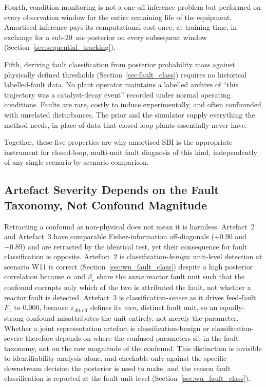 \documentclass[aps,pre,twocolumn,superscriptaddress]{revtex4-2}
\begin{document}
Fourth, condition monitoring is not a one-off inference problem but performed on every observation window for the entire remaining life of the equipment. Amortised inference pays its computational cost once, at
training time, in exchange for a sub-20~ms posterior on every subsequent
window (Section~\ref{sec:sequential_tracking}).%

Fifth, deriving fault classification from posterior probability mass
against physically defined thresholds (Section~\ref{sec:fault_class})
requires no historical labelled-fault data. No plant operator maintains a
labelled archive of ``this trajectory was a catalyst-decay event'' recorded
under normal operating conditions. Faults are rare, costly to induce
experimentally, and often confounded with unrelated disturbances. The
prior and the simulator supply everything the method needs, in place of
data that closed-loop plants essentially never have.

Together, these five properties are why amortised SBI is the appropriate
instrument for closed-loop, multi-unit fault diagnosis of this kind,
independently of any single scenario-by-scenario comparison.%

\subsection{Artefact Severity Depends on the Fault Taxonomy, Not Confound Magnitude}
\label{sec:disc_taxonomy}

Retracting a confound as non-physical does not mean it is harmless.
Artefact~2 and Artefact~3 have
comparable Fisher-information off-diagonals ($+0.90$ and $-0.89$) and are
retracted by the identical test, yet their consequence for fault
classification is opposite. Artefact~2 is classification-\emph{benign}:
unit-level detection at scenario W11 is correct
(Section~\ref{sec:wu_fault_class}) despite a high posterior correlation
because $\alpha$ and $\beta_r$ share the \emph{same} reactor fault
unit such that the confound corrupts only which of the two is attributed the
fault, not whether a reactor fault is detected. Artefact~3 is
classification-\emph{severe} as it drives feed-fault $F_1$ to $0.000$, because
$z_{A0,\mathrm{eff}}$ defines its \emph{own}, distinct fault unit, so an
equally-strong confound misattributes the unit entirely, not merely the
parameter. Whether a joint representation artefact
is classification-benign or classification-severe therefore depends on where
the confused parameters sit in the fault taxonomy, not on the raw magnitude
of the confound. This distinction is invisible to identifiability analysis
alone, and checkable only against the specific downstream decision the posterior
is used to make, and the reason fault classification is reported at the
fault-unit level (Section~\ref{sec:wu_fault_class}).
\end{document}
